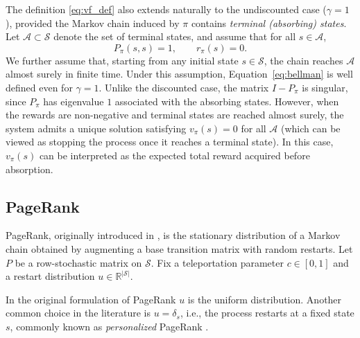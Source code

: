 \documentclass[letterpaper, 10 pt, conference]{ieeeconf}
\newcommand{\A}{\mathcal{A}}
\begin{document}
The definition \eqref{eq:vf_def} also extends naturally to the undiscounted case
($\gamma=1$), provided the Markov chain induced by $\pi$ contains
\emph{terminal (absorbing) states}.
Let $\A\subset\mathcal{S}$ denote the set of terminal states, and assume
that for all $s\in \A$,
$$
P_\pi(s,s)=1,
\qquad
r_\pi(s)=0.
$$
We further assume that, starting from any initial state $s\in\mathcal{S}$, the
chain reaches $\A$ almost surely in finite time.
Under this assumption, Equation~\eqref{eq:bellman} is well defined even for $\gamma=1$.
Unlike the discounted case, the matrix $I-P_\pi$ is singular, since
$P_\pi$ has eigenvalue $1$ associated with the absorbing states.
However, when the rewards are non-negative and terminal states are reached almost
surely, the system admits a unique solution satisfying $v_\pi(s)=0$ for all
$\A$ (which can be viewed as stopping the process once it reaches a terminal state).
In this case, $v_\pi(s)$ can be interpreted as the expected total reward acquired before absorption. 





\subsection{PageRank}

PageRank, originally introduced in \cite{brin1998anatomy}, is the stationary
distribution of a Markov chain obtained by augmenting a base transition matrix
with random restarts.
Let $P$ be a row-stochastic matrix on $\mathcal{S}$.
Fix a teleportation parameter $c\in[0,1]$ and a restart distribution
$u\in\mathbb{R}^{|\mathcal{S}|}$. 

In the original formulation of PageRank $u$ is the uniform distribution. Another common choice in the literature is $u = \delta_s$, i.e., the process restarts at a fixed state $s$, commonly known as \emph{personalized} PageRank \cite{jeh2003scaling}.
\end{document}
